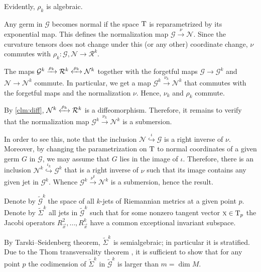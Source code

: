 \documentclass[a4paper,10pt]{article}
\begin{document}
Evidently, $\rho_k$ is algebraic.

Any germ in $\mathcal{G}$ becomes normal if the space $\mathrm{T}$ is reparametrized by its exponential map.
This defines the normalization map 
$\mathcal{G}\xrightarrow{\nu} \mathcal{N}$.   Since the curvature tensors does not change under this (or any other) coordinate
change, $\nu$ commutes with   $\rho_k : \mathcal {G}, \mathcal {N} \to \mathcal R^k$.





The maps $\mathcal{G}^k\xrightarrow{\rho_k}\mathcal{R}^k\z{\xleftrightarrow{\rho_k}}\mathcal{N}^k$ together with the forgetful maps $\mathcal{G}\to\mathcal{G}^k$ and $\mathcal{N}\to\mathcal{N}^k$  commute.
In particular, we get a map $\mathcal{G}^k\xrightarrow{\nu_k}\mathcal{N}^k$ that commutes with the forgetful maps and the normalization $\nu$.  Hence, $\nu _k$ and $\rho _k$ commute.

By \ref{clm:diff}, $\mathcal{N}^k\xleftrightarrow{\rho_k}\mathcal{R}^k$ is a diffeomorphism. Therefore,  it remains to verify that the normalization map $\mathcal{G}^k\xrightarrow{\nu_k}\mathcal{N}^k$ is  a submersion.

In order to see this, 
note that the inclusion $\mathcal{N}\stackrel{\iota}{\hookrightarrow} \mathcal{G}$ is a right inverse of $\nu$.
Moreover, by changing the parametrization on $\mathrm{T}$ to normal coordinates of a given germ $G$ in $\mathcal{G}$, we may assume that $G$ lies in the image of $\iota$.
Therefore, there is an inclusion $\mathcal{N}^k\stackrel{\iota_k}{\hookrightarrow} \mathcal{G}^k$ that is a right inverse of $\nu$ such that its image contains any given jet  in $\mathcal{G}^k$.
Whence $\mathcal{G}^k\xrightarrow{\nu^k} \mathcal{N}^k$ is a submersion,
%
 hence the result.
\qeds

Denote by $\tilde{\mathcal{G}}^k$ the space of all $k$-jets of Riemannian metrics at a given point $p$.
Denote by $\tilde\Sigma^k$ all jets in $\tilde{\mathcal{G}}^k$ such that for some nonzero tangent vector $\text{\sc{x}}\in\mathrm{T}_p$ the Jacobi operators $R^2_\vec x,\dots,R^k_\vec x$ have a common exceptional invariant subspace.

By Tarski--Seidenberg theorem, $\tilde\Sigma^k$ is semialgebraic; in particular it is stratified.
Due to the Thom transversality theorem \cite[2.3.2]{eliashberg-mishachev}, it is sufficient to show that for any point $p$ the codimension of
$\tilde\Sigma^k$  in $\tilde{\mathcal G}^k$ is larger than $m=\dim M$.
\end{document}
